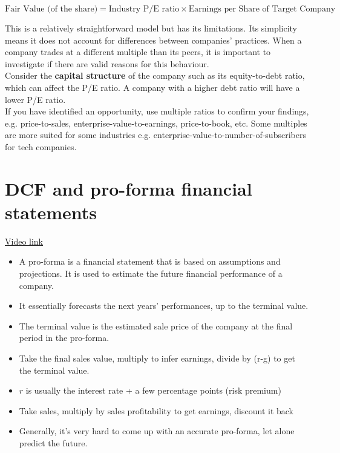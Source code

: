 \begin{equation}
    \text{Fair Value (of the share)} = \text{Industry P/E ratio} \times \text{Earnings per Share of Target Company}
\end{equation}

This is a relatively straightforward model but has its limitations. Its simplicity means it does not account for differences between companies' practices. When a company trades at a different multiple than its peers, it is important to investigate if there are valid reasons for this behaviour.\\

Consider the \textbf{capital structure} of the company such as its equity-to-debt ratio, which can affect the P/E ratio. A company with a higher debt ratio will have a lower P/E ratio.\\

If you have identified an opportunity, use multiple ratios to confirm your findings, e.g. price-to-sales, enterprise-value-to-earnings, price-to-book, etc. Some multiples are more suited for some industries e.g. enterprise-value-to-number-of-subscribers for tech companies.

\section{DCF and pro-forma financial statements}
\href{https://youtu.be/ynlAcc99b4c}{Video link}

\begin{itemize}
    \item A pro-forma is a financial statement that is based on assumptions and projections. It is used to estimate the future financial performance of a company.
    \item It essentially forecasts the next years' performances, up to the terminal value.
    \item The terminal value is the estimated sale price of the company at the final period in the pro-forma.
    \item Take the final sales value, multiply to infer earnings, divide by (r-g) to get the terminal value.
    \item $r$ is usually the interest rate + a few percentage points (risk premium)
    \item Take sales, multiply by sales profitability to get earnings, discount it back
    \item Generally, it's very hard to come up with an accurate pro-forma, let alone predict the future.
\end{itemize}

